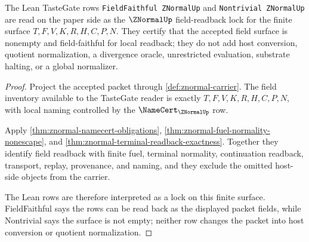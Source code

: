 \begin{theorem}
\label{thm:znormal-tastegate-field-readback-lock}
The Lean TasteGate rows \texttt{FieldFaithful ZNormalUp} and \texttt{Nontrivial ZNormalUp} are read on the paper side as the $\ZNormalUp$ field-readback lock for the finite surface $T,F,V,K,R,H,C,P,N$. They certify that the accepted field surface is nonempty and field-faithful for local readback; they do not add host conversion, quotient normalization, a divergence oracle, unrestricted evaluation, substrate halting, or a global normalizer.
\end{theorem}
\begin{proof}
Project the accepted packet through \autoref{def:znormal-carrier}. The field inventory available to the TasteGate reader is exactly $T,F,V,K,R,H,C,P,N$, with local naming controlled by the $\NameCert_{\ZNormalUp}$ row.

Apply \autoref{thm:znormal-namecert-obligations}, \autoref{thm:znormal-fuel-normality-nonescape}, and \autoref{thm:znormal-terminal-readback-exactness}. Together they identify field readback with finite fuel, terminal normality, continuation readback, transport, replay, provenance, and naming, and they exclude the omitted host-side objects from the carrier.

The Lean rows are therefore interpreted as a lock on this finite surface. FieldFaithful says the rows can be read back as the displayed packet fields, while Nontrivial says the surface is not empty; neither row changes the packet into host conversion or quotient normalization.
\end{proof}

